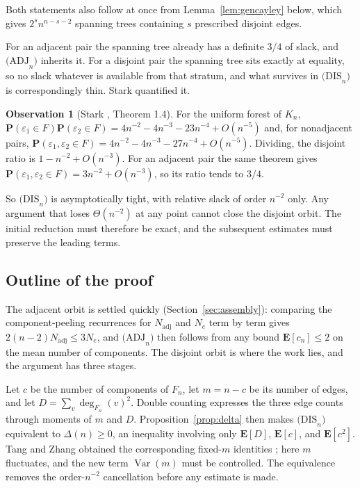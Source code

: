 \documentclass[11pt,a4paper]{amsart}
\theoremstyle{plain}
\theoremstyle{definition}
\newtheorem{observation}[theorem]{Observation}
\newcommand{\PR}{\mathbf{P}}
\newcommand{\EX}{\mathbf{E}}
\newcommand{\Var}{\operatorname{Var}}
\newcommand{\dg}{\operatorname{deg}}
\newcommand{\Nc}{N}
\newcommand{\ADJ}{\mathrm{(ADJ}_n\mathrm{)}}
\newcommand{\DIS}{\mathrm{(DIS}_n\mathrm{)}}
\begin{document}
Both statements also follow at once from Lemma~\ref{lem:gencayley} below,
which gives $2^s n^{n-s-2}$ spanning trees containing $s$ prescribed disjoint
edges.

For an adjacent pair the spanning tree already has a definite $3/4$ of slack, and
$\ADJ$ inherits it. For a disjoint pair the spanning tree sits exactly at
equality, so no slack whatever is available from that stratum, and what survives
in $\DIS$ is correspondingly thin. Stark quantified it.

\begin{observation}[Stark \cite{Stark2011}, Theorem 1.4]\label{obs:rate}
For the uniform forest of $K_n$,
$\PR(\varepsilon_1 \in F)\PR(\varepsilon_2 \in F)
 = 4n^{-2} - 4n^{-3} - 23n^{-4} + O(n^{-5})$ and, for nonadjacent pairs,
$\PR(\varepsilon_1,\varepsilon_2 \in F)
 = 4n^{-2} - 4n^{-3} - 27n^{-4} + O(n^{-5})$. Dividing, the disjoint ratio is
$1 - n^{-2} + O(n^{-3})$. For an adjacent pair the same theorem gives
$\PR(\varepsilon_1,\varepsilon_2\in F)=3n^{-2}+O(n^{-3})$, so its ratio tends
to $3/4$.
\end{observation}

So $\DIS$ is asymptotically tight, with relative slack of order $n^{-2}$ only.
Any argument that loses $\Theta(n^{-2})$ at any point cannot close the disjoint
orbit. The initial reduction must therefore be exact, and the subsequent
estimates must preserve the leading terms.

\subsection{Outline of the proof}\label{ss:outline}

The adjacent orbit is settled quickly (Section~\ref{sec:assembly}): comparing the
component-peeling recurrences for $\Nc_{\mathrm{adj}}$ and $\Nc_e$ term by term
gives $2(n-2)\Nc_{\mathrm{adj}} \le 3\Nc_e$, and $\ADJ$ then follows from any
bound $\EX[c_n] \le 2$ on the mean number of components. The disjoint orbit is
where the work lies, and the argument has three stages.

Let $c$ be the number of components of $F_n$, let $m=n-c$ be its number of
edges, and let $D=\sum_v\dg_{F_n}(v)^2$. Double counting expresses the three
edge counts through moments of $m$ and $D$. Proposition~\ref{prop:delta} then
makes $\DIS$ equivalent to $\Delta(n)\ge0$, an inequality involving only
$\EX[D]$, $\EX[c]$, and $\EX[c^2]$. Tang and Zhang obtained the corresponding
fixed-$m$ identities \cite{TZ2026a,TZ2026b}; here $m$ fluctuates, and the new
term $\Var(m)$ must be controlled. The equivalence removes the order-$n^{-2}$
cancellation before any estimate is made.
\end{document}
